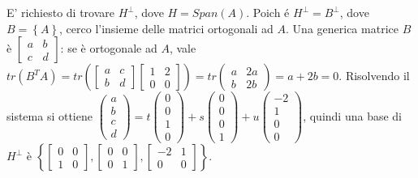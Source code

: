 \documentclass{article}
\begin{document}
\begin{enumerate}
E' richiesto di trovare $H^{\perp }$, dove $H=Span\left( A\right) $. Poich%
\'{e} $H^{\perp }=B^{\perp }$, dove $B=\left\{ A\right\} $, cerco l'insieme
delle matrici ortogonali ad $A$. Una generica matrice $B$ \`{e} $\left[ 
\begin{array}{cc}
a & b \\ 
c & d%
\end{array}%
\right] $: se \`{e} ortogonale ad $A$, vale $tr\left( B^{T}A\right)
=tr\left( \left[ 
\begin{array}{cc}
a & c \\ 
b & d%
\end{array}%
\right] \left[ 
\begin{array}{cc}
1 & 2 \\ 
0 & 0%
\end{array}%
\right] \right) =tr\left( 
\begin{array}{cc}
a & 2a \\ 
b & 2b%
\end{array}%
\right) =a+2b=0$. Risolvendo il sistema si ottiene $\left( 
\begin{array}{c}
a \\ 
b \\ 
c \\ 
d%
\end{array}%
\right) =t\left( 
\begin{array}{c}
0 \\ 
0 \\ 
1 \\ 
0%
\end{array}%
\right) +s\left( 
\begin{array}{c}
0 \\ 
0 \\ 
0 \\ 
1%
\end{array}%
\right) +u\left( 
\begin{array}{c}
-2 \\ 
1 \\ 
0 \\ 
0%
\end{array}%
\right) $, quindi una base di $H^{\perp }$ \`{e} $\left\{ \left[ 
\begin{array}{cc}
0 & 0 \\ 
1 & 0%
\end{array}%
\right] ,\left[ 
\begin{array}{cc}
0 & 0 \\ 
0 & 1%
\end{array}%
\right] ,\left[ 
\begin{array}{cc}
-2 & 1 \\ 
0 & 0%
\end{array}%
\right] \right\} $.
\end{enumerate}
\end{document}
